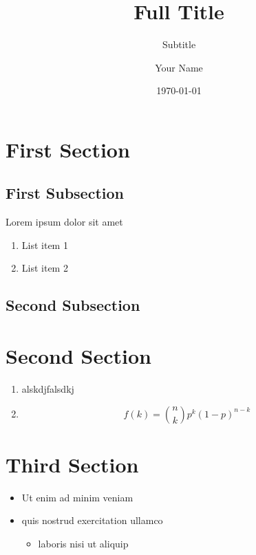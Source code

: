 \documentclass[xcolor=dvipsnames]{beamer}
\title[TITLE]{Full Title}
\subtitle{Subtitle}
\author{Your Name}
\institute[UIUC]{University of Illinois Urbana-Champaign}
\date{\today}
\begin{document}
\begin{frame}
\titlepage
\end{frame}

\begin{frame}
	\tableofcontents
\end{frame}
	
\section{First Section}
\subsection{First Subsection}
\begin{frame}
    Lorem ipsum dolor sit amet
    \begin{enumerate}
        \item List item 1
        \item List item 2
    \end{enumerate}
\end{frame}
\subsection{Second Subsection}

\section{Second Section}

\begin{frame}
\begin{enumerate}
	\item alskdjfalsdkj 
	\item \begin{equation} 
  f\left(k\right) = \binom{n}{k} p^k\left(1-p\right)^{n-k}
  \label{eq:binom}
\end{equation} 
\end{enumerate}

\section{Third Section}

\begin{itemize}
	\item Ut enim ad minim veniam
	\item quis nostrud exercitation ullamco
	\begin{itemize}
	    \item laboris nisi ut aliquip 
    \end{itemize}
\end{itemize}
\end{frame}
\end{document}
